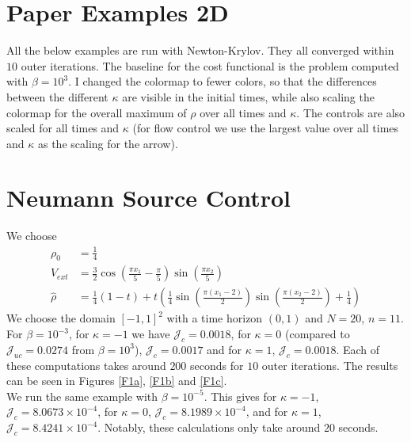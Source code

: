 \documentclass[11pt, a4paper]{article}
\theoremstyle{definition}
\newcommand{\hr}{\widehat \rho}
\begin{document}
	\section*{Paper Examples 2D}
	All the below examples are run with Newton-Krylov. They all converged within $10$ outer iterations. The baseline for the cost functional is the problem computed with $\beta = 10^3$.
	I changed the colormap to fewer colors, so that the differences between the different $\kappa$ are visible in the initial times, while also scaling the colormap for the overall maximum of $\rho$ over all times and $\kappa$.
	The controls are also scaled for all times and $\kappa$ (for flow control we use the largest value over all times and $\kappa$ as the scaling for the arrow).
	\section{Neumann Source Control}
	We choose 
	\begin{align*}
		\rho_0 &= \frac{1}{4}\\
		V_{ext} &= \frac{3}{2}\cos\left(\frac{\pi x_1}{5} - \frac{\pi}{5}\right)\sin\left(\frac{\pi x_2}{5}\right)\\
		\hr &= \frac{1}{4}(1 - t) + t\left(\frac{1}{4}\sin\left(\frac{\pi \left(x_1 - 2\right)}{2}\right)\sin\left(\frac{\pi (x_2 - 2)}{2}\right) + \frac{1}{4}\right)
	\end{align*}
	We choose the domain $[-1,1]^2$ with a time horizon $(0,1)$ and $N = 20$, $n = 11$. 
	For $\beta = 10^{-3}$, for $\kappa = -1$ we have $\mathcal J_c = 0.0018$, for $\kappa = 0$ (compared to $\mathcal J_{uc} = 0.0274$ from $\beta = 10^3$), $\mathcal J_c = 0.0017$ and for $\kappa = 1$, $\mathcal J_c = 0.0018$. Each of these computations takes around $200$ seconds for $10$ outer iterations. The results can be seen in Figures \ref{F1a}, \ref{F1b} and \ref{F1c}.\\
	We run the same example with $\beta = 10^{-5}$. This gives for $\kappa = -1$, $\mathcal J_c = 8.0673 \times 10^{-4}$, for $\kappa = 0$, $\mathcal J_c = 8.1989 \times 10^{-4}$, and for $\kappa = 1$, $\mathcal J_c = 8.4241 \times 10^{-4}$. Notably, these calculations only take around $20$ seconds. 
	
\end{document}
